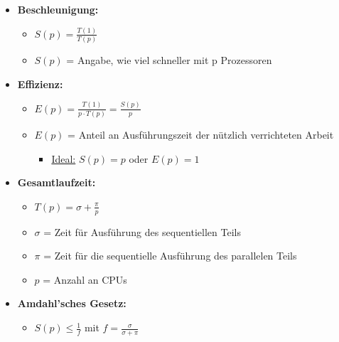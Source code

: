 			\begin{itemize}
				\item \textbf{Beschleunigung:}
				\begin{itemize}
					\item {\LARGE ${S}{\left(p\right)}=\frac{T\left(1\right)}{T\left(p\right)}$}
					\item ${S}{\left(p\right)}$ = Angabe, wie viel schneller mit p Prozessoren
				\end{itemize}
				\item \textbf{Effizienz:}
				\begin{itemize}
					\item {\LARGE ${E}{\left(p\right)}=\frac{T\left(1\right)}{p\cdot T\left(p\right)}=\frac{{S}{\left(p\right)}}{p}$}
					\item ${E}{\left(p\right)}$ = Anteil an Ausführungszeit der nützlich verrichteten Arbeit
					\begin{itemize}
						\item \underline{Ideal:} ${S}{\left(p\right)} = {p}$ oder ${E}{\left(p\right)} = {1}$
					\end{itemize}
				\end{itemize}
				\item \textbf{Gesamtlaufzeit:}
				\begin{itemize}
					\item {\LARGE ${T}{\left(p\right)} = \sigma + \frac{\pi}{{p}}$}
					\item $\sigma$ = Zeit für Ausführung des sequentiellen Teils
					\item $\pi$ = Zeit für die sequentielle Ausführung des parallelen Teils
					\item ${p}$ = Anzahl an CPUs
				\end{itemize}
				\item \textbf{Amdahl'sches Gesetz:}
				\begin{itemize}
					\item {\LARGE ${S}{\left(p\right)} \le \frac{1}{f}$} mit {\LARGE ${f} = \frac{\sigma}{\sigma + \pi}$}
				\end{itemize}
			\end{itemize}
